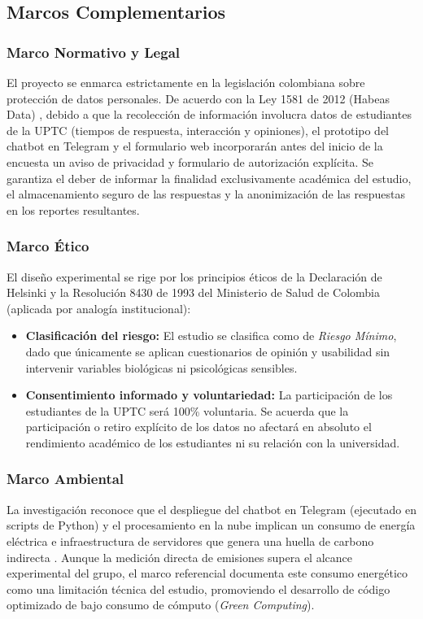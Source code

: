\documentclass[12pt,letterpaper]{article}
\begin{document}
\subsection{Marcos Complementarios}

\subsubsection{Marco Normativo y Legal}
El proyecto se enmarca estrictamente en la legislación colombiana sobre protección de datos personales. De acuerdo con la Ley 1581 de 2012 (Habeas Data) \cite{ley1581}, debido a que la recolección de información involucra datos de estudiantes de la UPTC (tiempos de respuesta, interacción y opiniones), el prototipo del chatbot en Telegram y el formulario web incorporarán antes del inicio de la encuesta un aviso de privacidad y formulario de autorización explícita. Se garantiza el deber de informar la finalidad exclusivamente académica del estudio, el almacenamiento seguro de las respuestas y la anonimización de las respuestas en los reportes resultantes.
 
\subsubsection{Marco Ético}
El diseño experimental se rige por los principios éticos de la Declaración de Helsinki \cite{helsinki2013} y la Resolución 8430 de 1993 del Ministerio de Salud de Colombia \cite{res8430} (aplicada por analogía institucional):
\begin{itemize}
    \item \textbf{Clasificación del riesgo:} El estudio se clasifica como de \textit{Riesgo Mínimo}, dado que únicamente se aplican cuestionarios de opinión y usabilidad sin intervenir variables biológicas ni psicológicas sensibles.
    \item \textbf{Consentimiento informado y voluntariedad:} La participación de los estudiantes de la UPTC será 100\% voluntaria. Se acuerda que la participación o retiro explícito de los datos no afectará en absoluto el rendimiento académico de los estudiantes ni su relación con la universidad.
\end{itemize}
 
\subsubsection{Marco Ambiental}
La investigación reconoce que el despliegue del chatbot en Telegram (ejecutado en scripts de Python) y el procesamiento en la nube implican un consumo de energía eléctrica e infraestructura de servidores que genera una huella de carbono indirecta \cite{strubell2019}. Aunque la medición directa de emisiones supera el alcance experimental del grupo, el marco referencial documenta este consumo energético como una limitación técnica del estudio, promoviendo el desarrollo de código optimizado de bajo consumo de cómputo (\textit{Green Computing}).
\end{document}

